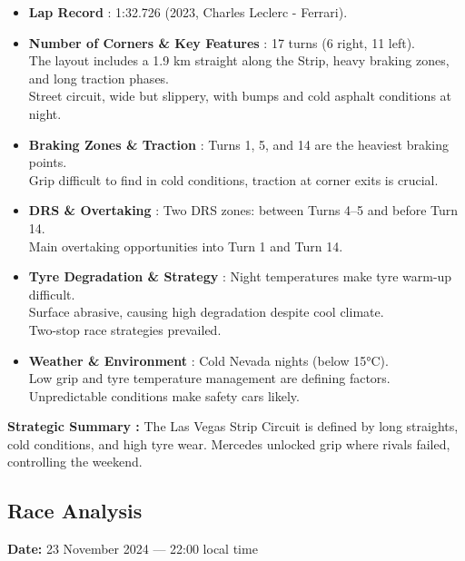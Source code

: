 \begin{itemize}
    \item \textbf{Lap Record} : 1:32.726 (2023, Charles Leclerc - Ferrari).
    
    \item \textbf{Number of Corners \& Key Features} : 17 turns (6 right, 11 left). \\
    The layout includes a 1.9 km straight along the Strip, heavy braking zones, and long traction phases. \\
    Street circuit, wide but slippery, with bumps and cold asphalt conditions at night.
    
    \item \textbf{Braking Zones \& Traction} : Turns 1, 5, and 14 are the heaviest braking points. \\
    Grip difficult to find in cold conditions, traction at corner exits is crucial.
    
    \item \textbf{DRS \& Overtaking} : Two DRS zones: between Turns 4–5 and before Turn 14. \\
    Main overtaking opportunities into Turn 1 and Turn 14.
    
    \item \textbf{Tyre Degradation \& Strategy} : Night temperatures make tyre warm-up difficult. \\
    Surface abrasive, causing high degradation despite cool climate. \\
    Two-stop race strategies prevailed.
    
    \item \textbf{Weather \& Environment} : Cold Nevada nights (below 15°C). \\
    Low grip and tyre temperature management are defining factors. \\
    Unpredictable conditions make safety cars likely.
\end{itemize}

\textbf{Strategic Summary :} The Las Vegas Strip Circuit is defined by long straights, cold conditions, and high tyre wear. Mercedes unlocked grip where rivals failed, controlling the weekend.

\subsection{Race Analysis}

\textbf{Date:} 23 November 2024 — 22:00 local time

